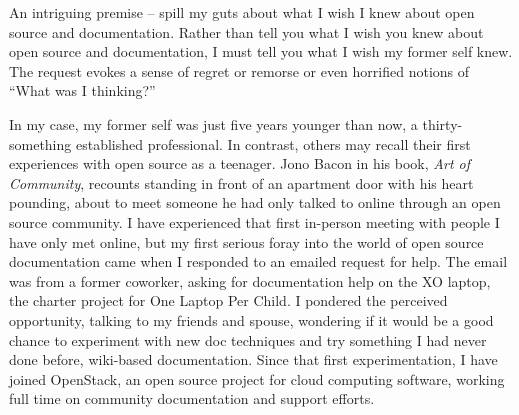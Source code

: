 

An intriguing premise -- spill my guts about what I wish I knew about open
source and documentation. Rather than tell you what I wish you knew about open
source and documentation, I must tell you what I wish my former self knew. The
request evokes a sense of regret or remorse or even horrified notions of ``What
was I thinking?'' 

In my case, my former self was just five years younger than now, a
thirty-something established professional. In contrast, others may recall their
first experiences with open source as a teenager. Jono Bacon in his book,
\textit{Art of Community}, recounts standing in front of an apartment door with
his heart pounding, about to meet someone he had only talked to online through
an open source community. I have experienced that first in-person meeting with
people I have only met online, but my first serious foray into the world of open
source documentation came when I responded to an emailed request for help. The
email was from a former coworker, asking for documentation help on the XO
laptop, the charter project for One Laptop Per Child. I pondered the perceived
opportunity, talking to my friends and spouse, wondering if it would be a good
chance to experiment with new doc techniques and try something I had never done
before, wiki-based documentation. Since that first experimentation, I have joined
OpenStack, an open source project for cloud computing software, working full
time on community documentation and support efforts. 

